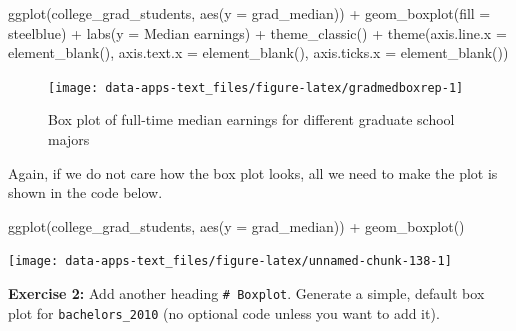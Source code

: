 \documentclass[
]{book}
\makeatletter
\newenvironment{Shaded}{\begin{snugshade}}{\end{snugshade}}
\newcommand{\AttributeTok}[1]{\textcolor[rgb]{0.61,0.61,0.61}{#1}}
\newcommand{\FunctionTok}[1]{\textcolor[rgb]{0,0,0}{#1}}
\newcommand{\NormalTok}[1]{#1}
\newcommand{\SpecialCharTok}[1]{\textcolor[rgb]{0,0,0}{#1}}
\newcommand{\StringTok}[1]{\textcolor[rgb]{0.5,0.5,0.5}{#1}}
\newenvironment{kframe}{%
\medskip{}
\setlength{\fboxsep}{.8em}
 \def\at@end@of@kframe{}%
 \ifinner\ifhmode%
  \def\at@end@of@kframe{\end{minipage}}%
  \begin{minipage}{\columnwidth}%
 \fi\fi%
 \def\FrameCommand##1{\hskip\@totalleftmargin \hskip-\fboxsep
 \colorbox{shadecolor}{##1}\hskip-\fboxsep
     \hskip-\linewidth \hskip-\@totalleftmargin \hskip\columnwidth}%
 \MakeFramed {\advance\hsize-\width
   \@totalleftmargin\z@ \linewidth\hsize
   \@setminipage}}%
 {\par\unskip\endMakeFramed%
 \at@end@of@kframe}
\renewenvironment{Shaded}{\begin{kframe}}{\end{kframe}}
\newenvironment{rmdblock}[1]
  {\begin{shaded*}
  }
  {\end{shaded*}
  }
\newenvironment{learncheck}
  {\begin{rmdblock}{warning}}
  {\end{rmdblock}}
\makeatother
\begin{document}
\begin{Shaded}
\begin{Highlighting}[]
\FunctionTok{ggplot}\NormalTok{(college\_grad\_students, }\FunctionTok{aes}\NormalTok{(}\AttributeTok{y =}\NormalTok{ grad\_median)) }\SpecialCharTok{+}
  \FunctionTok{geom\_boxplot}\NormalTok{(}\AttributeTok{fill =} \StringTok{\textquotesingle{}steelblue\textquotesingle{}}\NormalTok{) }\SpecialCharTok{+}
  \FunctionTok{labs}\NormalTok{(}\AttributeTok{y =} \StringTok{\textquotesingle{}Median earnings\textquotesingle{}}\NormalTok{) }\SpecialCharTok{+}
  \FunctionTok{theme\_classic}\NormalTok{() }\SpecialCharTok{+}
  \FunctionTok{theme}\NormalTok{(}\AttributeTok{axis.line.x =} \FunctionTok{element\_blank}\NormalTok{(),}
        \AttributeTok{axis.text.x =} \FunctionTok{element\_blank}\NormalTok{(),}
        \AttributeTok{axis.ticks.x =} \FunctionTok{element\_blank}\NormalTok{())}
\end{Highlighting}
\end{Shaded}

\begin{figure}

{\centering \texttt{[image: data-apps-text\_files/figure-latex/gradmedboxrep-1]} 

}

\caption{Box plot of full-time median earnings for different graduate school majors}\label{fig:gradmedboxrep}
\end{figure}

Again, if we do not care how the box plot looks, all we need to make the plot is shown in the code below.

\begin{Shaded}
\begin{Highlighting}[]
\FunctionTok{ggplot}\NormalTok{(college\_grad\_students, }\FunctionTok{aes}\NormalTok{(}\AttributeTok{y =}\NormalTok{ grad\_median)) }\SpecialCharTok{+}
  \FunctionTok{geom\_boxplot}\NormalTok{()}
\end{Highlighting}
\end{Shaded}

\begin{center}\texttt{[image: data-apps-text\_files/figure-latex/unnamed-chunk-138-1]} \end{center}

\begin{learncheck}
\textbf{Exercise 2:} Add another heading \texttt{\#\ Boxplot}. Generate
a simple, default box plot for \texttt{bachelors\_2010} (no optional
code unless you want to add it).
\end{learncheck}
\end{document}

